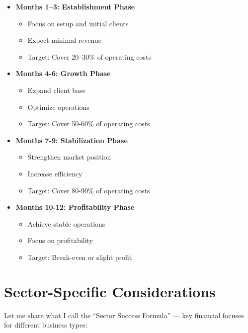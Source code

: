 \begin{tcolorbox}[colback=white,colframe=primarydark,title=\textbf{12-Month Revenue Framework}]
\begin{itemize}
    \item \textbf{Months 1--3: Establishment Phase}
    \begin{itemize}
        \item Focus on setup and initial clients
        \item Expect minimal revenue
        \item Target: Cover 20--30\% of operating costs
    \end{itemize}

    \item \textbf{Months 4-6: Growth Phase}
    \begin{itemize}
        \item Expand client base
        \item Optimize operations
        \item Target: Cover 50-60\% of operating costs
    \end{itemize}

    \item \textbf{Months 7-9: Stabilization Phase}
    \begin{itemize}
        \item Strengthen market position
        \item Increase efficiency
        \item Target: Cover 80-90\% of operating costs
    \end{itemize}

    \item \textbf{Months 10-12: Profitability Phase}
    \begin{itemize}
        \item Achieve stable operations
        \item Focus on profitability
        \item Target: Break-even or slight profit
    \end{itemize}
\end{itemize}
\end{tcolorbox}

\section{Sector-Specific Considerations}\label{sec:sector-specific}

Let me share what I call the ``Sector Success Formula'' --- key financial focuses for different business types:

